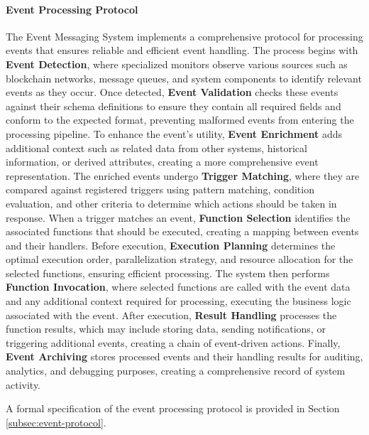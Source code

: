 \documentclass[12pt,a4paper]{article}
\begin{document}
\paragraph{Event Processing Protocol}
The Event Messaging System implements a comprehensive protocol for processing events that ensures reliable and efficient event handling. The process begins with \textbf{Event Detection}, where specialized monitors observe various sources such as blockchain networks, message queues, and system components to identify relevant events as they occur. Once detected, \textbf{Event Validation} checks these events against their schema definitions to ensure they contain all required fields and conform to the expected format, preventing malformed events from entering the processing pipeline. To enhance the event's utility, \textbf{Event Enrichment} adds additional context such as related data from other systems, historical information, or derived attributes, creating a more comprehensive event representation. The enriched events undergo \textbf{Trigger Matching}, where they are compared against registered triggers using pattern matching, condition evaluation, and other criteria to determine which actions should be taken in response. When a trigger matches an event, \textbf{Function Selection} identifies the associated functions that should be executed, creating a mapping between events and their handlers. Before execution, \textbf{Execution Planning} determines the optimal execution order, parallelization strategy, and resource allocation for the selected functions, ensuring efficient processing. The system then performs \textbf{Function Invocation}, where selected functions are called with the event data and any additional context required for processing, executing the business logic associated with the event. After execution, \textbf{Result Handling} processes the function results, which may include storing data, sending notifications, or triggering additional events, creating a chain of event-driven actions. Finally, \textbf{Event Archiving} stores processed events and their handling results for auditing, analytics, and debugging purposes, creating a comprehensive record of system activity.

A formal specification of the event processing protocol is provided in Section \ref{subsec:event-protocol}.


\end{document}
